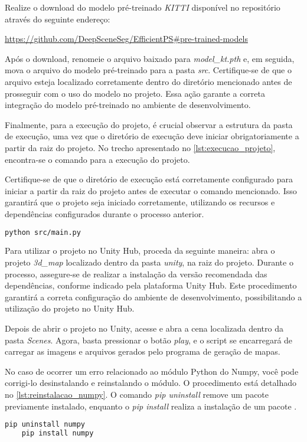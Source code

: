 Realize o download do modelo pré-treinado \emph{KITTI} disponível no repositório através do seguinte endereço:

\url{https://github.com/DeepSceneSeg/EfficientPS#pre-trained-models}

Após o download, renomeie o arquivo baixado para \emph{model\_kt.pth} e, em seguida, mova o arquivo do modelo pré-treinado para a pasta \emph{src}. Certifique-se de que o arquivo esteja localizado corretamente dentro do diretório mencionado antes de prosseguir com o uso do modelo no projeto. Essa ação garante a correta integração do modelo pré-treinado no ambiente de desenvolvimento.

Finalmente, para a execução do projeto, é crucial observar a estrutura da pasta de execução, uma vez que o diretório de execução deve iniciar obrigatoriamente a partir da raiz do projeto. No trecho apresentado no \cref{lst:execucao_projeto}, encontra-se o comando para a execução do projeto.

Certifique-se de que o diretório de execução está corretamente configurado para iniciar a partir da raiz do projeto antes de executar o comando mencionado. Isso garantirá que o projeto seja iniciado corretamente, utilizando os recursos e dependências configurados durante o processo anterior.

\begin{lstlisting}[caption={Trecho de código com comando para execução do projeto},label={lst:execucao_projeto},language=Bash,showstringspaces=false]
    python src/main.py
\end{lstlisting}

Para utilizar o projeto no Unity Hub, proceda da seguinte maneira: abra o projeto \emph{3d\_map} localizado dentro da pasta \emph{unity}, na raiz do projeto. Durante o processo, assegure-se de realizar a instalação da versão recomendada das dependências, conforme indicado pela plataforma Unity Hub. Este procedimento garantirá a correta configuração do ambiente de desenvolvimento, possibilitando a utilização do projeto no Unity Hub.

Depois de abrir o projeto no Unity, acesse e abra a cena localizada dentro da pasta \emph{Scenes}. Agora, basta pressionar o botão \emph{play}, e o script se encarregará de carregar as imagens e arquivos gerados pelo programa de geração de mapas. 

No caso de ocorrer um erro relacionado ao módulo Python do Numpy, você pode corrigi-lo desinstalando e reinstalando o módulo. O procedimento está detalhado no \cref{lst:reinstalacao_numpy}. O comando \emph{pip uninstall} remove um pacote previamente instalado, enquanto o \emph{pip install} realiza a instalação de um pacote \cite{pip_install, pip_uninstall}.

\begin{lstlisting}[caption={Trecho de código com os comandos para reinstalação do Numpy},label={lst:reinstalacao_numpy},language=Bash,showstringspaces=false]
    pip uninstall numpy
    pip install numpy
\end{lstlisting}
